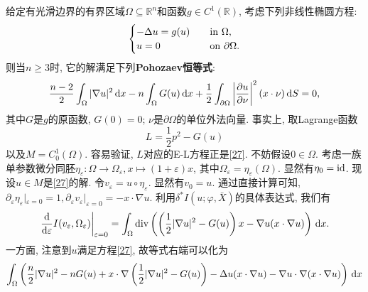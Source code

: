 \begin{example}[Pohozaev恒等式]
    给定有光滑边界的有界区域$\Omega \subseteq \mathbb{R}^n$和函数$g \in C^1(\mathbb{R})$, 考虑下列非线性椭圆方程:
    \begin{equation}\label{27}
        \begin{cases} 
            -\Delta u = g(u) \quad &{\rm in}\ \Omega, \\  
            u = 0 \quad &{\rm on}\ \partial\Omega. 
        \end{cases} 
    \end{equation}
    则当$n \geq 3$时, 它的解满足下列\textbf{Pohozaev恒等式}:
    \begin{equation*}
        \frac{n - 2}{2}\int_{\Omega}|\nabla u|^2 \,{\rm d}x - n\int_{\Omega}G(u) \,{\rm d}x + \frac{1}{2}\int_{\partial\Omega}\left|\frac{\partial u}{\partial\nu}\right|^2(x \cdot \nu) \,{\rm d}S = 0, 
    \end{equation*}
    其中$G$是$g$的原函数, $G(0) = 0$; $\nu$是$\partial\Omega$的单位外法向量. 事实上, 取Lagrange函数 
    \begin{equation*}
        L = \frac{1}{2}p^2 - G(u)
    \end{equation*}
    以及$M = C_0^1(\Omega)$. 容易验证, $L$对应的E-L方程正是\eqref{27}. 不妨假设$0 \in \Omega$. 
    考虑一族单参数微分同胚$\eta_{\varepsilon}\colon \Omega \rightarrow \Omega_{\varepsilon}, x \mapsto (1 + \varepsilon)x$, 其中$\Omega_{\varepsilon} = \eta_{\varepsilon}(\Omega)$. 显然有$\eta_0 = {\rm id}$.
    现设$u \in M$是\eqref{27}的解. 令$v_{\varepsilon} = u \circ \eta_{\varepsilon}$. 显然有$v_0 = u$.
    通过直接计算可知, $\partial_{\varepsilon}\eta_{\varepsilon}|_{\varepsilon = 0} = 1, \partial_{\varepsilon}v_{\varepsilon}|_{\varepsilon = 0} = -x \cdot \nabla u$.
    利用$\delta^*I(u; \varphi, \bar{X})$的具体表达式, 我们有 
    \begin{equation*}
        \left.\frac{{\rm d}}{{\rm d}\varepsilon}I(v_{\varepsilon}, \Omega_{\varepsilon})\right|_{\varepsilon = 0} = \int_{\Omega}{\rm div}\left(\left(\frac{1}{2}|\nabla u|^2 - G(u)\right)x - \nabla u(x \cdot \nabla u)\right) \,{\rm d}x.
    \end{equation*}
    一方面, 注意到$u$满足方程\eqref{27}, 故等式右端可以化为
    \begin{equation}\label{28}
        \begin{aligned}
            \int_{\Omega}&\left(\frac{n}{2}|\nabla u|^2 - nG(u) + x \cdot \nabla\left(\frac{1}{2}|\nabla u|^2 -G(u)\right) - \Delta u(x \cdot \nabla u) - \nabla u \cdot \nabla(x \cdot \nabla u)\right) \,{\rm d}x \\ 

\end{aligned}
\end{equation}
\end{example}
